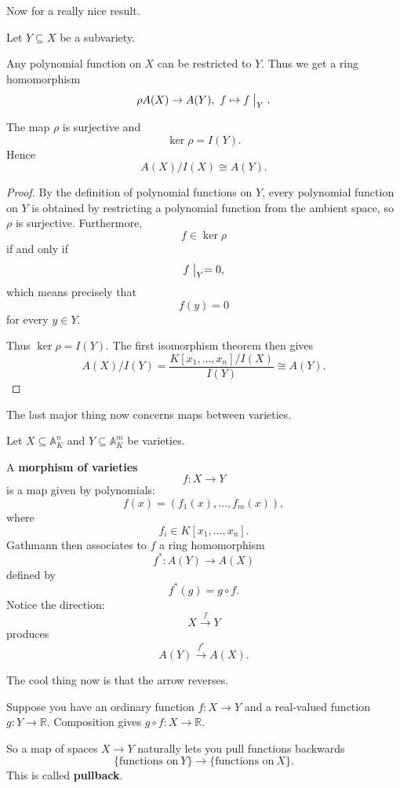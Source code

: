 \documentclass[11pt]{article}
\begin{document}
Now for a really nice result. 

Let $Y \subseteq X$ be a subvariety. 

Any polynomial function on $X$ can be restricted to $Y$. 
Thus we get a ring homomorphism 
\[
    \rho A(X) \to A(Y), \ f \mapsto f\bigm|_{Y}. 
\]

\begin{prop}
    The map $\rho$ is surjective and 
    \[
        \ker \rho = I(Y). 
    \]
    Hence 
    \[
        A(X) / I(X) \cong A(Y).
    \]
\end{prop}
\begin{proof}
    By the definition of polynomial functions on 
    $Y$, every polynomial function on $Y$ is obtained by 
    restricting a polynomial function from the ambient 
    space, so $\rho$ is surjective. 
    Furthermore, 
    \[
        f \in \ker \rho 
    \]
    if and only if 
    \[ 
        f\bigm|_Y = 0, 
    \]
    which means precisely that 
    \[
        f(y) = 0
    \]
    for every $y\in Y$. 

    Thus $\ker \rho = I(Y)$. 
    The first isomorphism theorem then gives 
    \[
        A(X)/I(Y) 
        = \frac{K[x_1,\ldots,x_n]/I(X)}{I(Y)} 
        \cong A(Y).
    \]
\end{proof}

The last major thing now concerns maps between 
varieties. 

Let $X \subseteq \mathbb A_K^n$ and $Y \subseteq \mathbb A_K^m$
be varieties. 

\begin{defn}
    A \textbf{morphism of varieties} 
    \[
        f : X \to Y
    \]
    is a map given by polynomials: 
    \[
        f(x) = (f_1(x), \ldots, f_m(x)),
    \]
    where 
    \[
        f_i \in K[x_1,\ldots,x_n]. 
    \]
    Gathmann then associates to $f$ a ring homomorphism 
    \[
        f^* : A(Y) \to A(X)
    \]
    defined by 
    \[
        f^*(g) = g \circ f. 
    \]
    Notice the direction: 
    \[
        X \overset{f}{\to} Y 
    \]
    produces 
    \[
        A(Y) \overset{f^*}{\to} A(X). 
    \]
\end{defn}

The cool thing now is that the arrow reverses. 

Suppose you have an ordinary function 
$f: X \to Y$ and a real-valued function $g : Y \to \mathbb R$. 
Composition gives $g \circ f : X \to \mathbb R$. 

So a map of spaces $X \to Y$ naturally lets you 
pull functions backwards 
\[
    \{\text{functions on} \ Y\} 
    \to 
    \{\text{functions on} \ X\}.
\]
This is called \textbf{pullback}. 
\end{document}
